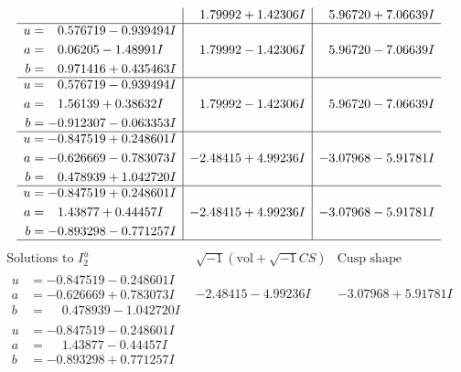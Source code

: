 \documentclass[1p]{elsarticle_modified}
\theoremstyle{definition}
\newcommand{\I}{\sqrt{-1}}
\begin{document}
$$\begin{array}{c|c|c}
 & \phantom{-}1.79992 + 1.42306 I & \phantom{-}5.96720 + 7.06639 I \\ \hline\begin{aligned}
u &= \phantom{-}0.576719 - 0.939494 I \\
a &= \phantom{-}0.06205 - 1.48991 I \\
b &= \phantom{-}0.971416 + 0.435463 I\end{aligned}
 & \phantom{-}1.79992 - 1.42306 I & \phantom{-}5.96720 - 7.06639 I \\ \hline\begin{aligned}
u &= \phantom{-}0.576719 - 0.939494 I \\
a &= \phantom{-}1.56139 + 0.38632 I \\
b &= -0.912307 - 0.063353 I\end{aligned}
 & \phantom{-}1.79992 - 1.42306 I & \phantom{-}5.96720 - 7.06639 I \\ \hline\begin{aligned}
u &= -0.847519 + 0.248601 I \\
a &= -0.626669 - 0.783073 I \\
b &= \phantom{-}0.478939 + 1.042720 I\end{aligned}
 & -2.48415 + 4.99236 I & -3.07968 - 5.91781 I \\ \hline\begin{aligned}
u &= -0.847519 + 0.248601 I \\
a &= \phantom{-}1.43877 + 0.44457 I \\
b &= -0.893298 - 0.771257 I\end{aligned}
 & -2.48415 + 4.99236 I & -3.07968 - 5.91781 I\\
 \hline 
 \end{array}$$\newpage$$\begin{array}{c|c|c}  
\text{Solutions to }I^u_{2}& \I (\text{vol} + \sqrt{-1}CS) & \text{Cusp shape}\\
 \hline 
\begin{aligned}
u &= -0.847519 - 0.248601 I \\
a &= -0.626669 + 0.783073 I \\
b &= \phantom{-}0.478939 - 1.042720 I\end{aligned}
 & -2.48415 - 4.99236 I & -3.07968 + 5.91781 I \\ \hline\begin{aligned}
u &= -0.847519 - 0.248601 I \\
a &= \phantom{-}1.43877 - 0.44457 I \\
b &= -0.893298 + 0.771257 I\end{aligned}

\end{array}$$
\end{document}
